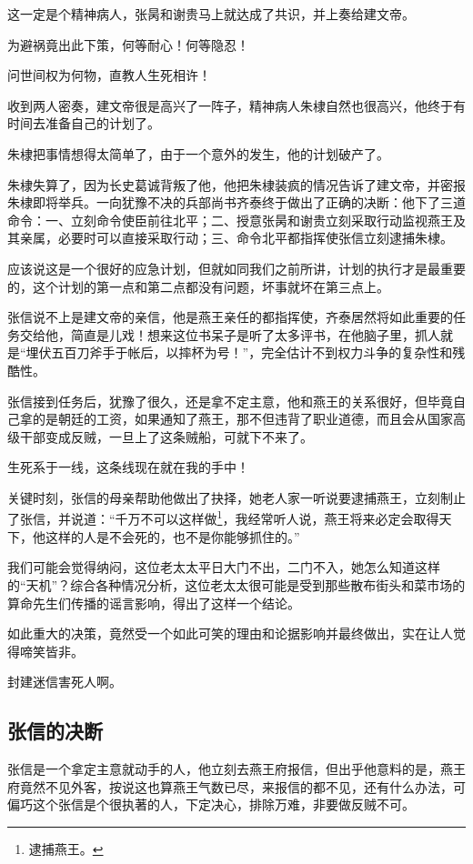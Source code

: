 \begin{multicols}{\theparacolNo}
		这一定是个精神病人，张昺和谢贵马上就达成了共识，并上奏给建文帝。

		为避祸竟出此下策，何等耐心！何等隐忍！

		问世间权为何物，直教人生死相许！

		收到两人密奏，建文帝很是高兴了一阵子，精神病人朱棣自然也很高兴，他终于有时间去准备自己的计划了。

		朱棣把事情想得太简单了，由于一个意外的发生，他的计划破产了。

		朱棣失算了，因为长史葛诚背叛了他，他把朱棣装疯的情况告诉了建文帝，并密报朱棣即将举兵。一向犹豫不决的兵部尚书齐泰终于做出了正确的决断：他下了三道命令：一、立刻命令使臣前往北平；二、授意张昺和谢贵立刻采取行动监视燕王及其亲属，必要时可以直接采取行动；三、命令北平都指挥使张信立刻逮捕朱棣。

		应该说这是一个很好的应急计划，但就如同我们之前所讲，计划的执行才是最重要的，这个计划的第一点和第二点都没有问题，坏事就坏在第三点上。

		张信说不上是建文帝的亲信，他是燕王亲任的都指挥使，齐泰居然将如此重要的任务交给他，简直是儿戏！想来这位书呆子是听了太多评书，在他脑子里，抓人就是“埋伏五百刀斧手于帐后，以摔杯为号！”，完全估计不到权力斗争的复杂性和残酷性。

		张信接到任务后，犹豫了很久，还是拿不定主意，他和燕王的关系很好，但毕竟自己拿的是朝廷的工资，如果通知了燕王，那不但违背了职业道德，而且会从国家高级干部变成反贼，一旦上了这条贼船，可就下不来了。

		生死系于一线，这条线现在就在我的手中！

		关键时刻，张信的母亲帮助他做出了抉择，她老人家一听说要逮捕燕王，立刻制止了张信，并说道：“千万不可以这样做\footnote{逮捕燕王。}，我经常听人说，燕王将来必定会取得天下，他这样的人是不会死的，也不是你能够抓住的。”

		我们可能会觉得纳闷，这位老太太平日大门不出，二门不入，她怎么知道这样的“天机”？综合各种情况分析，这位老太太很可能是受到那些散布街头和菜市场的算命先生们传播的谣言影响，得出了这样一个结论。

		如此重大的决策，竟然受一个如此可笑的理由和论据影响并最终做出，实在让人觉得啼笑皆非。

		封建迷信害死人啊。

		\subsection{张信的决断}
		张信是一个拿定主意就动手的人，他立刻去燕王府报信，但出乎他意料的是，燕王府竟然不见外客，按说这也算燕王气数已尽，来报信的都不见，还有什么办法，可偏巧这个张信是个很执著的人，下定决心，排除万难，非要做反贼不可。


\end{multicols}
